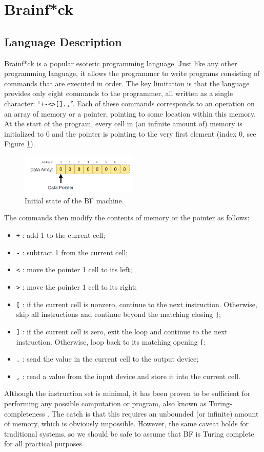 \section{Brainf*ck}\label{sec:brainfck}
\subsection{Language Description}
Brainf*ck is a popular esoteric programming language. Just like any other programming language, it allows the programmer to write programs consisting of commands that are executed in order. The key limitation is that the language provides only eight commands to the programmer, all written as a single character: ``\texttt{+-<>[].,}''. Each of these commands corresponds to an operation on an array of memory or a pointer, pointing to some location within this memory. At the start of the program, every cell in (an infinite amount of) memory is initialized to 0 and the pointer is pointing to the very first element (index 0, see Figure \ref{fig:bfmachine_initial}).
%
\begin{figure}[H]
  \centering
  \includegraphics[width=0.5\textwidth]{img/bfmachine_initial}
  \caption{Initial state of the BF machine.}
  \label{fig:bfmachine_initial}
\end{figure}
%
The commands then modify the contents of memory or the pointer as follows:
\begin{itemize}
\item \texttt{+} : add 1 to the current cell;
\item \texttt{-} : subtract 1 from the current cell;
\item \texttt{<} : move the pointer 1 cell to its left;
\item \texttt{>} : move the pointer 1 cell to its right;
\item \texttt{[} : if the current cell is nonzero, continue to the next instruction. Otherwise, skip all instructions and continue beyond the matching closing \texttt{]};
\item \texttt{]} : if the current cell is zero, exit the loop and continue to the next instruction. Otherwise, loop back to its matching opening \texttt{[};
\item \texttt{.} : send the value in the current cell to the output device;
\item \texttt{,} : read a value from the input device and store it into the current cell.
\end{itemize}
Although the instruction set is minimal, it has been proven to be sufficient for performing any possible computation or program, also known as Turing-completeness \cite{esolangs-bf}. The catch is that this requires an unbounded (or infinite) amount of memory, which is obviously impossible. However, the same caveat holds for traditional systems, so we should be safe to assume that BF is Turing complete for all practical purposes.

